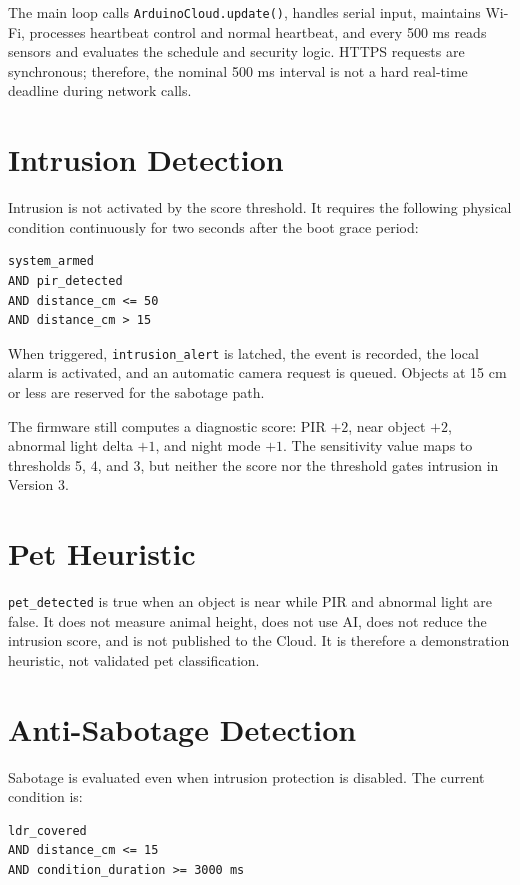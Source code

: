 \documentclass[11pt,a4paper]{report}
\begin{document}
The main loop calls \texttt{ArduinoCloud.update()}, handles serial input,
maintains Wi-Fi, processes heartbeat control and normal heartbeat, and every
500 ms reads sensors and evaluates the schedule and security logic. HTTPS
requests are synchronous; therefore, the nominal 500 ms interval is not a
hard real-time deadline during network calls.

\section{Intrusion Detection}
Intrusion is not activated by the score threshold. It requires the following
physical condition continuously for two seconds after the boot grace period:

\begin{lstlisting}
system_armed
AND pir_detected
AND distance_cm <= 50
AND distance_cm > 15
\end{lstlisting}

When triggered, \texttt{intrusion\_alert} is latched, the event is recorded,
the local alarm is activated, and an automatic camera request is queued.
Objects at 15 cm or less are reserved for the sabotage path.

The firmware still computes a diagnostic score: PIR $+2$, near object $+2$,
abnormal light delta $+1$, and night mode $+1$. The sensitivity value maps to
thresholds 5, 4, and 3, but neither the score nor the threshold gates
intrusion in Version 3.

\section{Pet Heuristic}
\texttt{pet\_detected} is true when an object is near while PIR and abnormal
light are false. It does not measure animal height, does not use AI, does not
reduce the intrusion score, and is not published to the Cloud. It is therefore
a demonstration heuristic, not validated pet classification.

\section{Anti-Sabotage Detection}
Sabotage is evaluated even when intrusion protection is disabled. The current
condition is:

\begin{lstlisting}
ldr_covered
AND distance_cm <= 15
AND condition_duration >= 3000 ms
\end{lstlisting}
\end{document}
